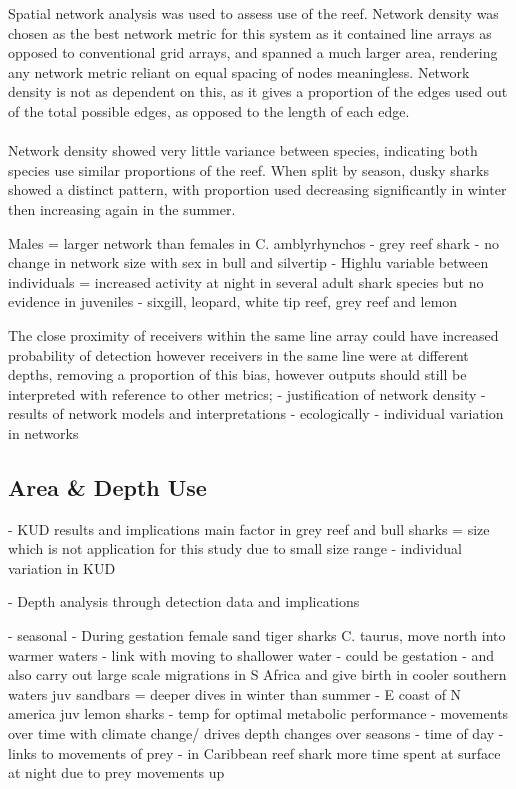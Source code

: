 \documentclass[11pt,a4paper]{article}
\begin{document}
	Spatial network analysis was used to assess use of the reef. Network density was chosen as the best network metric for this system as it contained line arrays as opposed to conventional grid arrays, and spanned a much larger area, rendering any network metric reliant on equal spacing of nodes meaningless. Network density is not as dependent on this, as it gives a proportion of the edges used out of the total possible edges, as opposed to the length of each edge.\\
	\\
	Network density showed very little variance between species, indicating both species use similar proportions of the reef. When split by season, dusky sharks showed a distinct pattern, with proportion used decreasing significantly in winter then increasing again in the summer. 
	
	
	Males = larger network than females in C. amblyrhynchos - grey reef shark - \citep{Espinoza2015}
	no change in network size with sex in bull and silvertip - \citep{Espinoza2015}
	Highlu variable between individuals = \citep{Lea2016}
	increased activity at night in several adult shark species but no evidence in juveniles - sixgill, leopard, white tip reef, grey reef and lemon \citep{Speed2010}
	
	The close proximity of receivers within the same line array could have increased probability of detection however receivers in the same line were at different depths, removing a proportion of this bias, however outputs should still be interpreted with reference to other metrics;
	- justification of network density	
	- results of network models and interpretations - ecologically
	- individual variation in networks 

	
	\subsection{Area \& Depth Use}
	
	- KUD results and implications
	main factor in grey reef and bull sharks = size \citep{Speed2010} which is not application for this study due to small size range
	- individual variation in KUD
	
	- Depth analysis through detection data and implications

	
	- seasonal - 
	During gestation female sand tiger sharks C. taurus, move north into warmer waters - link with moving to shallower water - could be gestation - and also carry out large scale migrations in S Africa and give birth in cooler southern waters \citep{Dicken2007}
	juv sandbars = deeper dives in winter than summer - E coast of N america \citep{Speed2010}
	juv lemon sharks - temp for optimal metabolic performance - movements over time with climate change/ drives depth changes over seasons \citep{Speed2010}
	- time of day - 
	links to movements of prey - in Caribbean reef shark more time spent at surface at night due to prey movements up \citep{Speed2010}
	
\end{document}
